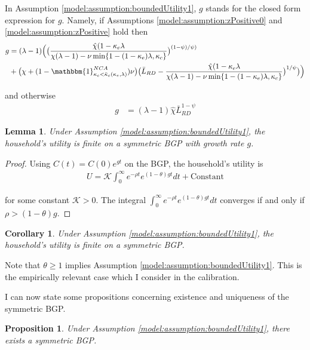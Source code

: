 \documentclass[11pt,english]{article}
\newtheorem{proposition}{Proposition}
\newtheorem{lemma}{Lemma}
\newtheorem{lemma_corollary}{Corollary}[lemma]
\begin{document}
In Assumption \ref{model:assumption:boundedUtility1}, $g$ stands for the closed form expression for $g$. Namely, if Assumptions \ref{model:assumption:zPositive0} and \ref{model:assumption:zPositive} hold then 
\begin{align}
g &= (\lambda - 1) \Big(  \big( \frac{\hat{\chi} (1-\kappa_e \lambda}{\chi(\lambda-1) - \nu \min \{1 - (1-\kappa_e) \lambda, \kappa_c \}} \big)^{(1-\psi)/\psi)} \\
&+ \big(\chi + (1- \mathbbm{1}^{NCA}_{\kappa_c < \bar{\kappa}_c(\kappa_e,\lambda)})\nu \big) \big( \bar{L}_{RD} -  \frac{\hat{\chi} (1-\kappa_e \lambda}{\chi(\lambda-1) - \nu \min \{1 - (1-\kappa_e) \lambda, \kappa_c \}} \big)^{1/\psi} \big) \Big) 
\end{align}

and otherwise
\begin{align}
g &= (\lambda -1) \hat{\chi} \bar{L}_{RD}^{1-\psi}
\end{align}

\begin{lemma}
	Under Assumption \ref{model:assumption:boundedUtility1}, the household's utility is finite on a symmetric BGP with growth rate $g$.
\end{lemma}

\begin{proof}
	Using $C(t) = C(0)e^{gt}$ on the BGP, the household's utility is
	\begin{align}
		U = \mathcal{K} \int_0^{\infty} e^{-\rho t} e^{(1-\theta)gt} dt + \text{Constant}
	\end{align}
	
	for some constant $\mathcal{K} > 0$. The integral $\int_0^{\infty} e^{-\rho t} e^{(1-\theta)gt} dt$ converges if and only if $\rho > (1-\theta)g$. 
\end{proof}




\begin{lemma_corollary}
	Under Assumption \ref{model:assumption:boundedUtility1}, the household's utility is finite on a symmetric BGP. 
\end{lemma_corollary}

Note that $\theta \ge 1$ implies Assumption \ref{model:assumption:boundedUtility1}. This is the empirically relevant case which I consider in the calibration.

I can now state some propositions concerning existence and uniqueness of the symmetric BGP. 

\begin{proposition}\label{proposition:BGPexistence}
	Under Assumption \ref{model:assumption:boundedUtility1}, there exists a symmetric BGP.
\end{proposition}
\end{document}
